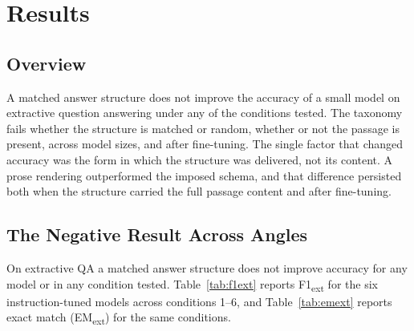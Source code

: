 \documentclass[master]{thesis}
\begin{document}
\chapter{Results}
\label{ch:results}

\section{Overview}

A matched answer structure does not improve the accuracy of a small model on extractive question answering under any of the conditions tested. The taxonomy fails whether the structure is matched or random, whether or not the passage is present, across model sizes, and after fine-tuning. The single factor that changed accuracy was the form in which the structure was delivered, not its content. A prose rendering outperformed the imposed schema, and that difference persisted both when the structure carried the full passage content and after fine-tuning.

\section{The Negative Result Across Angles}

On extractive QA a matched answer structure does not improve accuracy for any model or in any condition tested. Table~\ref{tab:f1ext} reports F1\textsubscript{ext} for the six instruction-tuned models across conditions 1--6, and Table~\ref{tab:emext} reports exact match (EM\textsubscript{ext}) for the same conditions.
\end{document}
